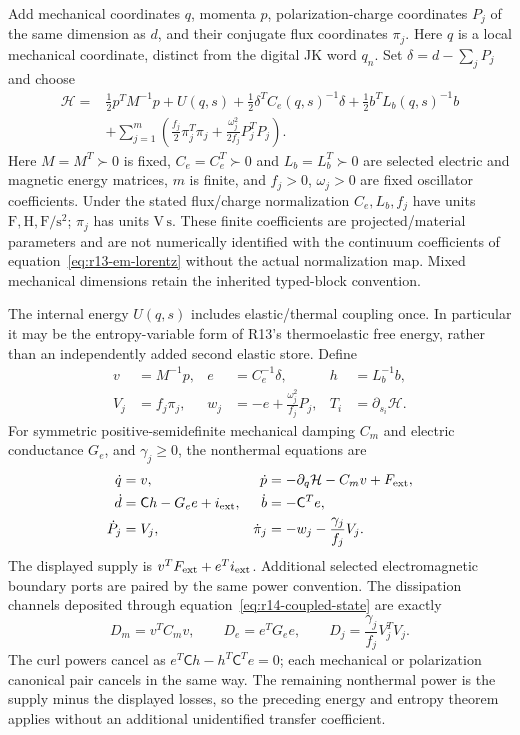 Add mechanical coordinates $q$, momenta $p$, polarization-charge coordinates
$P_j$ of the same dimension as $d$, and their conjugate flux coordinates
$\pi_j$. Here $q$ is a local mechanical coordinate, distinct from the digital
JK word $q_n$. Set $\delta=d-\sum_j P_j$ and choose
\begin{align}
 \mathcal H={}&\tfrac12p^TM^{-1}p+U(q,s)
       +\tfrac12\delta^T C_e(q,s)^{-1}\delta
       +\tfrac12 b^TL_b(q,s)^{-1}b\nonumber\\
       &+\sum_{j=1}^{m}\left(
          \tfrac{f_j}{2}\pi_j^T\pi_j
          +\tfrac{\omega_j^2}{2f_j}P_j^TP_j\right).
 \label{eq:r14-concrete-energy}
\end{align}
Here $M=M^T\succ0$ is fixed, $C_e=C_e^T\succ0$ and $L_b=L_b^T\succ0$
are selected electric and magnetic energy matrices, $m$ is finite, and
$f_j>0$, $\omega_j>0$ are fixed oscillator coefficients. Under the stated
flux/charge normalization $C_e,L_b,f_j$ have units
$\mathrm F,\mathrm H,\mathrm{F/s^2}$; $\pi_j$ has units $\mathrm{V\,s}$.
These finite coefficients are projected/material parameters and are not
numerically identified with the continuum coefficients of
equation~\eqref{eq:r13-em-lorentz} without the actual normalization map.
Mixed mechanical dimensions retain the inherited typed-block convention.

The internal energy $U(q,s)$ includes elastic/thermal coupling once. In
particular it may be the entropy-variable form of R13's thermoelastic free
energy, rather than an independently added second elastic store. Define
\begin{align}
 v&=M^{-1}p,& e&=C_e^{-1}\delta,& h&=L_b^{-1}b,\nonumber\\
 V_j&=f_j\pi_j,&
 w_j&=-e+\frac{\omega_j^2}{f_j}P_j,&
 T_i&=\partial_{s_i}\mathcal H.
 \label{eq:r14-concrete-efforts}
\end{align}
For symmetric positive-semidefinite mechanical damping $C_m$ and electric
conductance $G_e$, and $\gamma_j\ge0$, the nonthermal equations are
\begin{align}
 \dot q&=v,&\dot p&=-\partial_q\mathcal H-C_m v+F_{\rm ext},\nonumber\\
 \dot d&=\mathsf C h-G_e e+i_{\rm ext},&
 \dot b&=-\mathsf C^T e,\nonumber\\
 \dot P_j&=V_j,&
 \dot\pi_j&=-w_j-\frac{\gamma_j}{f_j}V_j.
 \label{eq:r14-concrete-evolution}
\end{align}
The displayed supply is $v^TF_{\rm ext}+e^Ti_{\rm ext}$.
Additional selected electromagnetic boundary ports are paired by the same
power convention. The dissipation channels deposited through
equation~\eqref{eq:r14-coupled-state} are exactly
\begin{equation}
 D_m=v^TC_m v,\qquad D_e=e^TG_e e,\qquad
 D_j=\frac{\gamma_j}{f_j}V_j^TV_j.
 \label{eq:r14-concrete-loss}
\end{equation}
The curl powers cancel as $e^T\mathsf C h-h^T\mathsf C^Te=0$;
each mechanical or polarization canonical pair cancels in the same way.
The remaining nonthermal power is the supply minus the displayed losses,
so the preceding energy and entropy theorem applies without an additional
unidentified transfer coefficient.

